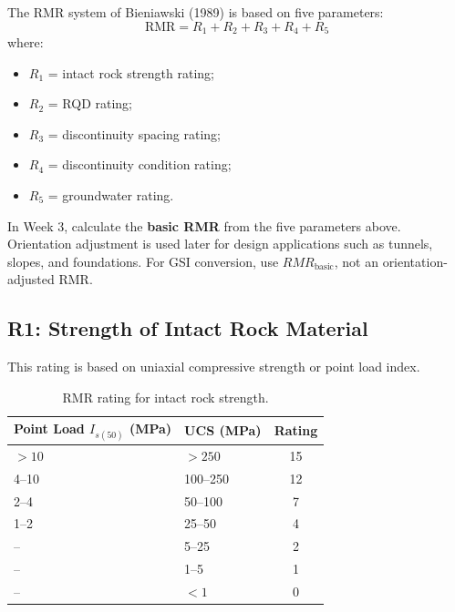 \documentclass[a4paper,12pt]{article}
\begin{document}
The RMR system of Bieniawski (1989) is based on five parameters:
\[
\text{RMR} = R_1 + R_2 + R_3 + R_4 + R_5
\]
where:
\begin{itemize}
    \item \(R_1\) = intact rock strength rating;
    \item \(R_2\) = RQD rating;
    \item \(R_3\) = discontinuity spacing rating;
    \item \(R_4\) = discontinuity condition rating;
    \item \(R_5\) = groundwater rating.
\end{itemize}

\begin{notebox}
In Week 3, calculate the \textbf{basic RMR} from the five parameters above.
Orientation adjustment is used later for design applications such as tunnels, slopes,
and foundations. For GSI conversion, use \(RMR_{\text{basic}}\), not an orientation-adjusted RMR.
\end{notebox}

\subsection{R1: Strength of Intact Rock Material}

This rating is based on uniaxial compressive strength or point load index.

\begin{table}[H]
\centering
\small
\begin{tabularx}{0.85\textwidth}{l l c}
\toprule
\textbf{Point Load \(I_{s(50)}\) (MPa)} & \textbf{UCS (MPa)} & \textbf{Rating} \\
\midrule
\(>10\) & \(>250\) & 15 \\
4--10 & 100--250 & 12 \\
2--4 & 50--100 & 7 \\
1--2 & 25--50 & 4 \\
-- & 5--25 & 2 \\
-- & 1--5 & 1 \\
-- & \(<1\) & 0 \\
\bottomrule
\end{tabularx}
\caption{RMR rating for intact rock strength.}
\label{tab:rmr_strength}
\end{table}

\end{document}
